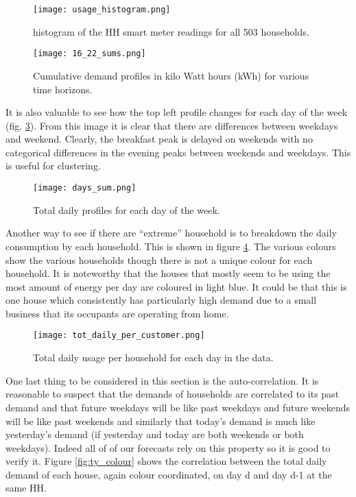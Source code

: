 \documentclass[a4paper]{article}
\begin{document}
\begin{figure}
\centering
\texttt{[image: usage\_histogram.png]}
\caption{histogram of the HH smart meter readings for all 503 households.}
\label{fig:hist} 
\end{figure}

\begin{figure}
\centering
\texttt{[image: 16\_22\_sums.png]}
\caption{Cumulative demand profiles in kilo Watt hours (kWh) for various time horizons.}
\label{fig:sums} 
\end{figure}

It is also valuable to see how the top left profile changes for each day of the week (fig. \ref{fig:days}). From this image it is clear that there are differences between weekdays and weekend. Clearly, the breakfast peak is delayed on weekends with no categorical differences in the evening peaks between weekends and weekdays. This is useful for clustering.

\begin{figure}
\centering
\texttt{[image: days\_sum.png]}
\caption{Total daily profiles for each day of the week.}
\label{fig:days} 
\end{figure}

Another way to see if there are ``extreme'' household is to breakdown the daily consumption by each household. This is shown in figure \ref{fig:totes}. The various colours show the various households though there is not a unique colour for each household. It is noteworthy that the houses that mostly seem to be using the most amount of energy per day are coloured in light blue. It could be that this is one house which consistently has particularly high demand due to a small business that its occupants are operating from home.

\begin{figure}
\centering
\texttt{[image: tot\_daily\_per\_customer.png]}
\caption{Total daily usage per household for each day in the data.}
\label{fig:totes}
\end{figure}

One last thing to be considered in this section is the auto-correlation. It is reasonable to suspect that the demands of households are correlated to its past demand and that future weekdays will be like past weekdays and future weekends will be like past weekends and similarly that today's demand is much like yesterday's demand (if yesterday and today are both weekends or both weekdays). Indeed all of of our forecasts rely on this property so it is good to verify it.  Figure \ref{fig:ty_colour} shows the correlation between the total daily demand of each house, again colour coordinated, on day d and day d-1 at the same HH.
\end{document}
